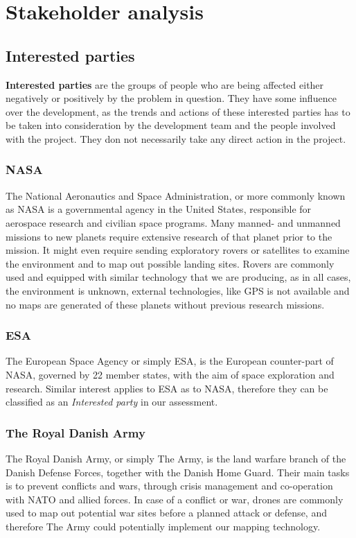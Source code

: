 \clearpage
\section{Stakeholder analysis}
	
\subsection{Interested parties}
\textbf{Interested parties} are the groups of people who are being affected either negatively or positively by the problem in question. They have some influence over the development, as the trends and actions of these interested parties has to be taken into consideration by the development team and the people involved with the project. They don not necessarily take any direct action in the project.

\subsubsection{NASA}
The National Aeronautics and Space Administration, or more commonly known as NASA is a governmental agency in the United States, responsible for aerospace research and civilian space programs. Many manned- and unmanned missions to new planets require extensive research of that planet prior to the mission. It might even require sending exploratory rovers or satellites to examine the environment and to map out possible landing sites. Rovers are commonly used and equipped with similar technology that we are producing, as in all cases, the environment is unknown, external technologies, like GPS is not available and no maps are generated of these planets without previous research missions. 

\subsubsection{ESA}
The European Space Agency or simply ESA, is the European counter-part of NASA, governed by 22 member states, with the aim of space exploration and research. Similar interest applies to ESA as to NASA, therefore they can be classified as an \textit{Interested party} in our assessment.

\subsubsection{The Royal Danish Army}
The Royal Danish Army, or simply The Army, is the land warfare branch of the Danish Defense Forces, together with the Danish Home Guard. Their main tasks is to prevent conflicts and wars, through crisis management and co-operation with NATO and allied forces\cite{armytasks}. In case of a conflict or war, drones are commonly used to map out potential war sites before a planned attack or defense, and therefore The Army could potentially implement our mapping technology.

